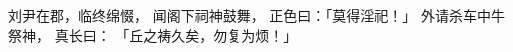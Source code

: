 
\switchcolumn*[\section{}]

刘尹在郡，临终绵惙，
闻阁下祠神鼓舞，
正色曰：「莫得淫祀！」
外请杀车中牛祭神，
真长曰：
「丘之祷久矣，勿复为烦！」

\switchcolumn



